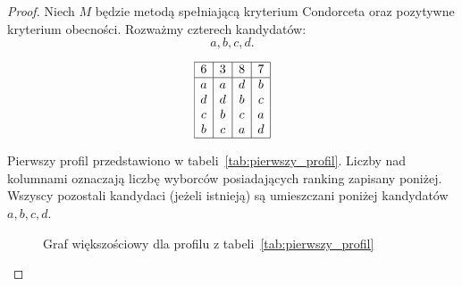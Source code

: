 \documentclass[12pt,a4paper]{mwrep}
\begin{document}
	\begin{proof}
		Niech \(M\) będzie metodą spełniającą kryterium Condorceta oraz pozytywne kryterium obecności. Rozważmy czterech kandydatów:
		\[
		a,b,c,d.
		\]
		
		\begin{table}[H]
			\centering
			\[
			\begin{array}{|c|c|c|c|}
				\hline
				6 & 3 & 8 & 7\\
				\hline
				a & a & d & b\\
				d & d & b & c\\
				c & b & c & a\\
				b & c & a & d\\
				\hline
			\end{array}
			\]
			\caption{Pierwszy profil preferencji}
			\label{tab:pierwszy_profil}
		\end{table}
		
		Pierwszy profil przedstawiono w tabeli~\ref{tab:pierwszy_profil}. Liczby nad kolumnami oznaczają liczbę wyborców posiadających ranking zapisany poniżej. Wszyscy pozostali kandydaci (jeżeli istnieją) są umieszczani poniżej kandydatów \(a,b,c,d\).
		
		\begin{figure}[H]
			\centering
			
		
		\caption{Graf większościowy dla profilu z tabeli~\ref{tab:pierwszy_profil}}
		\label{fig:graf_pierwszy_profil}
		\end{figure}
		

\end{proof}
\end{document}
